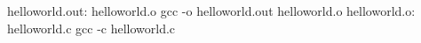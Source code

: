 helloworld.out: helloworld.o 
	gcc -o helloworld.out helloworld.o 
helloworld.o: helloworld.c 
	gcc -c helloworld.c
